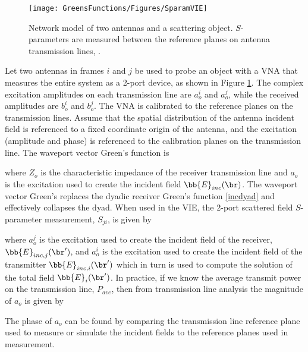 \begin{figure}[H] 
\centering
\texttt{[image: GreensFunctions/Figures/SparamVIE]}
\caption{Network model of two antennas and a scattering object. $S$-parameters are measured between the reference planes on antenna transmission lines, \cite{haynes2012vector}.}
\label{sparamviefig}
\end{figure}

Let two antennas in frames $i$ and $j$ be used to probe an object with a VNA that measures the entire system as a 2-port device, as shown in Figure \ref{sparamviefig}. The complex excitation amplitudes on each transmission line are $a_o^i$ and $a_o^j$, while the received amplitudes are $b_o^i$ and $b_o^j$. The VNA is calibrated to the reference planes on the transmission lines. Assume that the spatial distribution of the antenna incident field is referenced to a fixed coordinate origin of the antenna, and the excitation (amplitude and phase) is referenced to the calibration planes on the transmission line. The waveport vector Green's function is

\noindent where $Z_o$ is the characteristic impedance of the receiver transmission line and $a_o$ is the excitation used to create the incident field $\bb{E}_{inc}(\br)$. The waveport vector Green's replaces the dyadic receiver Green's function \eqref{incdyad} and effectively collapses the dyad.
When used in the VIE, the 2-port scattered field $S$-parameter measurement, $S_{ji}$, is given by 

\noindent where $a_o^j$ is the excitation used to create the incident field of the receiver, $\bb{E}_{inc,j}(\br')$, and $a_o^i$ is the excitation used to create the incident field of the transmitter $\bb{E}_{inc,i}(\br')$ which in turn is used to compute the solution of the total field $\bb{E}_{i}(\br')$.  In practice, if we know the average transmit power on the transmission line, $P_{ave}$, then from transmission line analysis the magnitude of $a_o$ is given by 

The phase of $a_o$ can be found by comparing the transmission line reference plane used to measure or simulate the incident fields to the reference planes used in measurement. 









